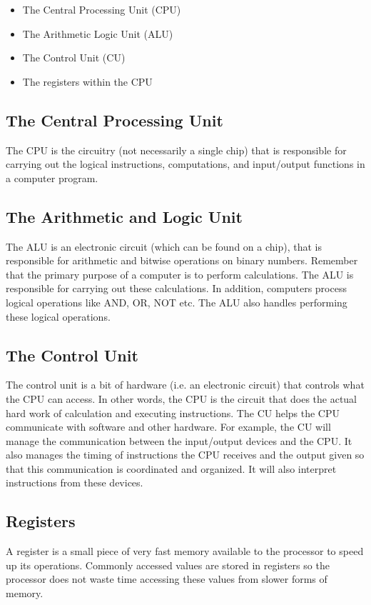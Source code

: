 \begin{itemize}
	\item The Central Processing Unit (CPU)
	\item The Arithmetic Logic Unit (ALU)
	\item The Control Unit (CU)
	\item The registers within the CPU
\end{itemize} 

\subsection*{The Central Processing Unit}
The CPU is the circuitry (not necessarily a single chip) that is responsible for carrying out the logical instructions, computations, and input/output functions in a computer program. 

\subsection*{The Arithmetic and Logic Unit}
The ALU is an electronic circuit (which can be found on a chip), that is responsible for arithmetic and bitwise operations on binary numbers. Remember that the primary purpose of a computer is to perform calculations. The ALU is responsible for carrying out these calculations. In addition, computers process logical operations like AND, OR, NOT etc. The ALU also handles performing these logical operations.


\subsection*{The Control Unit}
The control unit is a bit of hardware (i.e. an electronic circuit) that controls what the CPU can access. In other words, the CPU is the circuit that does the actual hard work of calculation and executing instructions. The CU helps the CPU communicate with software and other hardware. For example, the CU will manage the communication between the input/output devices and the CPU. It also manages the timing of instructions the CPU receives and the output given so that this communication is coordinated and organized. It will also interpret instructions from these devices. 


\subsection*{Registers} %
A register is a small piece of very fast memory available to the processor to speed up its operations. Commonly accessed values are stored in registers so the processor does not waste time accessing these values from slower forms of memory.

